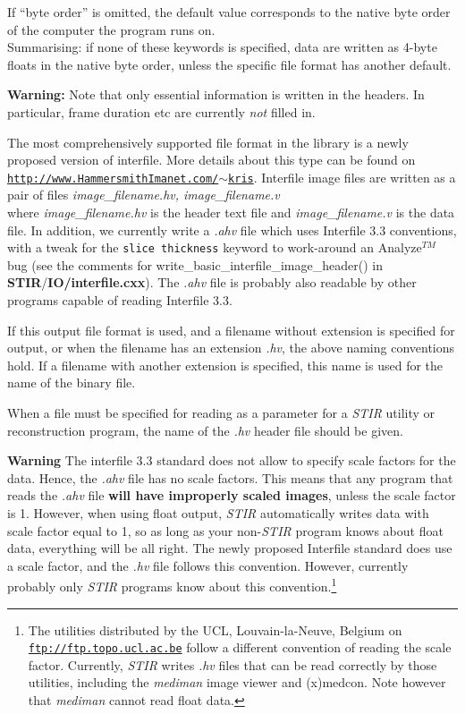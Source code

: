 \documentclass{article}
\def\R2Lurl#1#2{\mbox{\href{#1}{\tt #2}}}
\begin{document}
If ``byte order'' is omitted, the default value corresponds to 
the native byte order of the computer the program runs on.\\
Summarising: if none of these keywords is specified, data are 
written as 4-byte floats in the native byte order, unless the 
specific file format has another default.



\textbf{Warning:} Note that only essential information is written 
in the headers. In particular, frame duration etc are currently \textit{not} 
filled in.

{ 
}
\label{sec:outputinterfile}
The most comprehensively supported file format in the library 
is a newly proposed version of interfile. More details about 
this type can be found on \R2Lurl{http://www.HammersmithImanet.com/\ensuremath{\sim}kris}{http://www.HammersmithImanet.com/\ensuremath{\sim}kris}. 
Interfile image files are written as a pair of files
\textit{image\_filename.hv,
image\_filename.v}\\
where \textit{image\_filename.hv} is the header text file and \textit{image\_filename.v} 
is the data file. In addition, we currently write a \textit{.ahv} 
file which uses Interfile 3.3 conventions, with a tweak for the 
\texttt{slice thickness} keyword to work-around an Analyze$^{TM}$ 
bug (see the comments for write\_basic\_interfile\_image\_header() 
in \textbf{STIR}/\textbf{IO/interfile.cxx}). The \textit{.ahv} file is probably 
also readable by other programs capable of reading Interfile 
3.3.


If this output file format is used, and a filename without extension 
is specified for output, or when the filename has an extension \textit{.hv}, 
the above naming conventions hold. If a filename with another 
extension is specified, this name is used for the name of the 
binary file. 


When a file must be specified for reading as a parameter for 
a \textit{STIR} utility or reconstruction program, the name of the \textit{.hv} 
header file should be given. 



\textbf{Warning} The interfile 3.3 standard does not allow to specify 
scale factors for the data. Hence, the \textit{.ahv} file has no scale 
factors. This means that any program that reads the \textit{.ahv} 
file \textbf{will have improperly scaled images}, unless the scale 
factor is 1. However, when using float output, \textit{STIR} automatically 
writes data with scale factor equal to 1, so as long as your 
non-\textit{STIR} program knows about float data, everything will 
be all right. The newly proposed Interfile standard does use 
a scale factor, and the \textit{.hv} file follows this convention. 
However, currently probably only \textit{STIR} programs know about 
this convention.\footnote{{\small The utilities distributed by the UCL, 
Louvain-la-Neuve, Belgium on \R2Lurl{ftp://ftp.topo.ucl.ac.be }{ftp://ftp.topo.ucl.ac.be} 
follow a different convention of reading the scale factor. Currently, \textit{STIR} 
writes \textit{.hv} files that can be read correctly by those utilities, 
including the \textit{mediman} image viewer and (x)medcon. Note however 
that \textit{mediman} cannot read float data.}}
\end{document}
